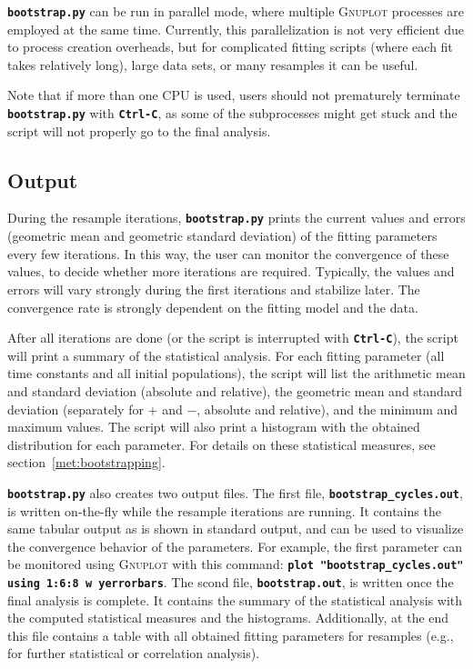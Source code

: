\documentclass[a4paper,10pt,DIV=15,openany,twoside=false]{scrbook}
\newcommand{\ttt}[1]{\textbf{\texttt{#1}}}
\begin{document}
\ttt{bootstrap.py} can be run in parallel mode, where multiple \textsc{Gnuplot} processes are employed at the same time.
Currently, this parallelization is not very efficient due to process creation overheads, but for complicated fitting scripts (where each fit takes relatively long), large data sets, or many resamples it can be useful.

Note that if more than one CPU is used, users should not prematurely terminate \ttt{bootstrap.py} with \ttt{Ctrl-C}, as some of the subprocesses might get stuck and the script will not properly go to the final analysis.

\subsection{Output}

During the resample iterations, \ttt{bootstrap.py} prints the current values and errors (geometric mean and geometric standard deviation) of the fitting parameters every few iterations.
In this way, the user can monitor the convergence of these values, to decide whether more iterations are required.
Typically, the values and errors will vary strongly during the first iterations and stabilize later.
The convergence rate is strongly dependent on the fitting model and the data.

After all iterations are done (or the script is interrupted with \ttt{Ctrl-C}), the script will print a summary of the statistical analysis.
For each fitting parameter (all time constants and all initial populations), the script will list the arithmetic mean and standard deviation (absolute and relative), the geometric mean and standard deviation (separately for $+$ and $-$, absolute and relative), and the minimum and maximum values.
The script will also print a histogram with the obtained distribution for each parameter.
For details on these statistical measures, see section~\ref{met:bootstrapping}.

\ttt{bootstrap.py} also creates two output files.
The first file, \ttt{bootstrap\_cycles.out}, is written on-the-fly while the resample iterations are running.
It contains the same tabular output as is shown in standard output, and can be used to visualize the convergence behavior of the parameters. For example, the first parameter can be monitored using \textsc{Gnuplot} with this command: \ttt{plot "bootstrap\_cycles.out" using 1:6:8 w yerrorbars}.
The scond file, \ttt{bootstrap.out}, is written once the final analysis is complete. It contains the summary of the statistical analysis with the computed statistical measures and the histograms.
Additionally, at the end this file contains a table with all obtained fitting parameters for resamples (e.g., for further statistical or correlation analysis).
\end{document}
